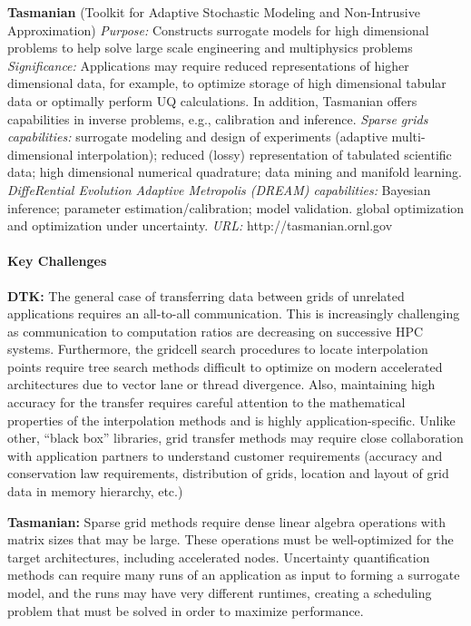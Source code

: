 {\bf Tasmanian} (Toolkit for Adaptive Stochastic Modeling
and Non-Intrusive Approximation)
{\it Purpose:} Constructs surrogate models for high
dimensional problems to help solve large scale engineering
and multiphysics problems
{\it Significance:}
Applications may require reduced representations of higher
dimensional data, for example, to optimize storage of high
dimensional tabular data or optimally perform UQ
calculations.  In addition, Tasmanian offers capabilities in
inverse problems, e.g., calibration and inference.
{\it Sparse grids capabilities:}
surrogate modeling and design of experiments (adaptive
multi-dimensional interpolation);
reduced (lossy) representation of tabulated scientific data;
high dimensional numerical quadrature;
data mining and manifold learning.
{\it DiffeRential Evolution Adaptive Metropolis (DREAM)
capabilities:}
Bayesian inference;
parameter estimation/calibration;
model validation.
global optimization and optimization under uncertainty.
{\it URL:}
http://tasmanian.ornl.gov

\paragraph{Key Challenges}

\indent

{\bf DTK:}
The general case of transferring data between grids of
unrelated applications requires an all-to-all
communication.
This is increasingly challenging as communication
to computation ratios are decreasing on successive HPC
systems.
Furthermore, the gridcell search procedures to locate
interpolation points require tree search methods
difficult to optimize on modern accelerated
architectures due to vector lane or thread divergence.
Also, maintaining high accuracy for the transfer requires
careful attention to the mathematical properties of the
interpolation methods and is highly application-specific.
Unlike other, ``black box'' libraries,
grid transfer methods may require close collaboration
with application partners to understand customer
requirements
(accuracy and conservation law requirements,
distribution of grids, location and layout of grid data in
memory hierarchy, etc.)

{\bf Tasmanian:}
Sparse grid methods require dense linear algebra operations
with matrix sizes that may be large.
These operations must be well-optimized for the target
architectures, including accelerated nodes.
Uncertainty quantification methods can require many runs of
an application as input to forming a surrogate model,
and the runs may have very different runtimes,
creating a scheduling problem that must be solved in order
to maximize performance.

